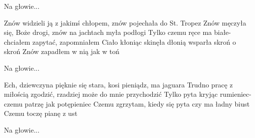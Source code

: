\documentclass[../../../songbook.tex]{subfiles}
\begin{document}
\-\hspace{1cm} Na głowie...		\newline

Znów widzieli ją z jakimś chłopem, znów pojechała do St. Tropez	\newline
Znów męczyła się, Boże drogi, znów na jachtach myła podłogi		\newline
Tylko czemu ręce ma białe- chciałem zapytać, zapomniałem		\newline
Ciało kłoniąc skinęła dłonią wsparła skroń o skroń				\newline
Znów zapadłem w nią jak w toń									\newline

\-\hspace{1cm} Na głowie...	\newline

Ech, dziewczyna pięknie się stara, kosi pieniądz, ma jaguara		\newline
Trudno pracę z miłością zgodzić, rzadziej może do mnie przychodzić	\newline
Tylko pyta kryjąc rumieniec- czemu patrzę jak potępieniec			\newline
Czemu zgrzytam, kiedy się pyta czy ma ładny biust					\newline
Czemu toczę pianę z ust												\newline

\-\hspace{1cm} Na głowie...
\end{document}
